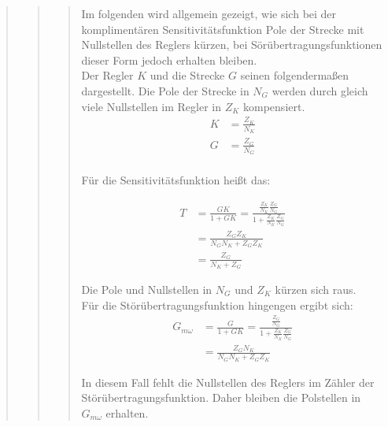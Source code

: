 \begin{quote}
\begin{quote}
\begin{quote}
            
            Im folgenden wird allgemein gezeigt, wie sich bei der komplimentären Sensitivitätsfunktion Pole der Strecke
            mit Nullstellen des Reglers kürzen, bei Sörübertragungsfunktionen dieser Form jedoch erhalten bleiben.\\
            Der Regler $K$ und die Strecke $G$ seinen folgendermaßen dargestellt. Die Pole der Strecke in $N_G$ werden
            durch gleich viele Nullstellen im Regler in $Z_K$ kompensiert.
            \begin{equation*}
            	\begin{split}
            		K &= \frac{Z_K}{N_K}\\
            		G &= \frac{Z_G}{N_G}\\
            	\end{split}
            \end{equation*}
            
            Für die Sensitivitätsfunktion heißt das:
            
            \begin{equation*}
            	\begin{split}
                    T &= \frac{GK}{1+GK} = \frac{\frac{Z_K}{N_K} \frac{Z_G}{N_G}}{1 + \frac{Z_K}{N_K}
                    \frac{Z_G}{N_G}}\\
                    &= \frac{Z_G Z_K}{N_G N_K + Z_G Z_K}\\
                    &= \frac{Z_G}{N_K + Z_G}
            	\end{split}
            \end{equation*}
                        
            Die Pole und Nullstellen in $N_G$ und $Z_K$ kürzen sich raus.\\
            
            Für die Störübertragungsfunktion hingengen ergibt sich:
            \begin{equation*}
            	\begin{split}
            		G_{m\omega} &= \frac{G}{1 + GK} = \frac{\frac{Z_G}{N_G}}{1 + \frac{Z_K}{N_K}\frac{Z_G}{N_G}}\\
            		&= \frac{Z_G N_K}{N_G N_K + Z_G Z_K}
            	\end{split}
            \end{equation*}
            
            In diesem Fall fehlt die Nullstellen des Reglers im Zähler der Störübertragungsfunktion. Daher bleiben die
            Polstellen in $G_{m\omega}$ erhalten.
            

\end{quote}
\end{quote}
\end{quote}

